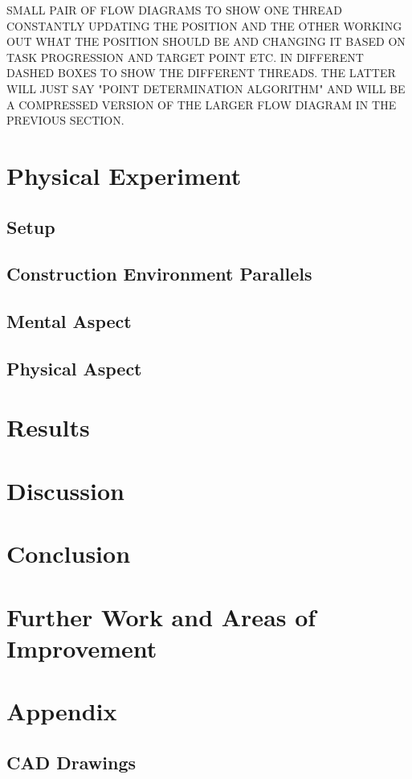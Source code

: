 \documentclass[11pt]{article}
\begin{document}
SMALL PAIR OF FLOW DIAGRAMS TO SHOW ONE THREAD CONSTANTLY UPDATING THE POSITION AND THE OTHER WORKING OUT WHAT THE POSITION SHOULD BE AND CHANGING IT BASED ON TASK PROGRESSION AND TARGET POINT ETC. IN DIFFERENT DASHED BOXES TO SHOW THE DIFFERENT THREADS. THE LATTER WILL JUST SAY "POINT DETERMINATION ALGORITHM" AND WILL BE  A COMPRESSED VERSION OF THE LARGER FLOW DIAGRAM IN THE PREVIOUS SECTION.

\section{Physical Experiment}
\subsection{Setup}
\subsection{Construction Environment Parallels}
\subsection{Mental Aspect}
\subsection{Physical Aspect}

\section{Results}

\section{Discussion}
\section{Conclusion}
\section{Further Work and Areas of Improvement}




\section{Appendix}
\subsection{CAD Drawings}
\end{document}
